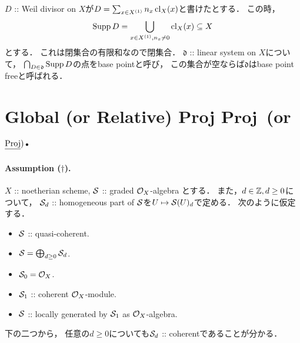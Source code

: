 \documentclass[a4paper]{jsarticle}
\newcommand{\lsd}{\mathfrak{d}}
\newcommand{\gProj}{\mathbf{Proj}\,}
\begin{document}
    \begin{Def}
        $D$ :: Weil divisor on $X$が$D=\sum_{x \in X^{(1)}} n_x \operatorname{cl}_X(x)$と書けたとする．
        この時，\[ \operatorname{Supp} D=\bigcup_{x \in X^{(1)}, n_x \neq 0} \operatorname{cl}_X(x) \subseteq X \]とする．
        これは閉集合の有限和なので閉集合．
        $\lsd$ :: linear system on $X$について，
        $\bigcap_{D \in \lsd} \Supp D$の点をbase pointと呼び，
        この集合が空ならば$\lsd$はbase point freeと呼ばれる．
    \end{Def}
 
\section{Global (or Relative) Proj $\gProj$ (or $\underline{\operatorname{Proj}})$.}
    \paragraph{Assumption ($\dagger$).}
    $X$ :: noetherian scheme, 
    $\mathcal{S}$ :: graded $\mathcal{O}_X$-algebra
    とする．
    また，$d \in \mathbb{Z}, d \geq 0$について，
    $\mathcal{S}_d$ :: homogeneous part of $\mathcal{S}$を$U \mapsto \mathcal{S}(U)_d$で定める．
    次のように仮定する．
    \begin{itemize}
        \item $\mathcal{S}$ :: quasi-coherent.
        \item $\mathcal{S}=\bigoplus_{d \geq 0} \mathcal{S}_d$.
        \item $\mathcal{S}_0=\mathcal{O}_X$.
        \item $\mathcal{S}_1$ :: coherent $\mathcal{O}_X$-module.
        \item $\mathcal{S}$ :: locally generated by $\mathcal{S}_1$ as $\mathcal{O}_X$-algebra.
    \end{itemize}
    下の二つから，
    任意の$d \geq 0$についても$\mathcal{S}_d$ :: coherentであることが分かる．

    \newpage %
\end{document}
